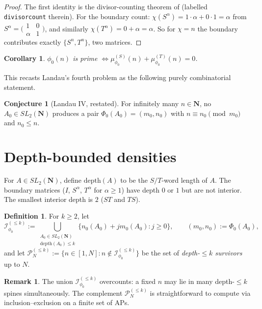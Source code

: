 \documentclass[11pt]{article}
\newtheorem{corollary}[theorem]{Corollary}
\theoremstyle{definition}
\newtheorem{definition}[theorem]{Definition}
\newtheorem{remark}[theorem]{Remark}
\newtheorem{conjecture}[theorem]{Conjecture}
\newcommand{\N}{\mathbf{N}}
\newcommand{\SLN}{SL_2(\N)}
\newcommand{\Phzero}{\Phi_0}
\newcommand{\Iset}{\mathcal{I}_{\phi_0}}
\newcommand{\depth}{\mathrm{depth}}
\begin{document}
\begin{proof}
The first identity is the divisor-counting theorem of \cite{shakov} (labelled \texttt{divisorcount} therein). For the boundary count: $\chi(S^\alpha) = 1 \cdot \alpha + 0 \cdot 1 = \alpha$ from $S^\alpha = \bigl(\begin{smallmatrix}1 & 0 \\ \alpha & 1\end{smallmatrix}\bigr)$, and similarly $\chi(T^\alpha) = 0 + \alpha = \alpha$. So for $\chi = n$ the boundary contributes exactly $\{S^n, T^n\}$, two matrices.
\end{proof}

\begin{corollary}\label{cor:mult-prime}
$\phi_0(n)$ is prime $\iff \mu^{(S)}_{\phi_0}(n) + \mu^{(T)}_{\phi_0}(n) = 0$. \end{corollary}

This recasts Landau's fourth problem as the following purely combinatorial statement.

\begin{conjecture}[Landau IV, restated]\label{conj:landau-mult}
For infinitely many $n \in \N$, no $A_0 \in \SLN$ produces a pair $\Phzero(A_0) = (m_0, n_0)$ with $n \equiv n_0 \pmod{m_0}$ and $n_0 \le n$.
\end{conjecture}

\section{Depth-bounded densities}\label{sec:depth}

For $A \in \SLN$, define $\depth(A)$ to be the $S/T$-word length of $A$. The boundary matrices ($I$, $S^\alpha$, $T^\alpha$ for $\alpha \ge 1$) have depth $0$ or $1$ but are not interior. The smallest interior depth is $2$ ($ST$ and $TS$).

\begin{definition}\label{def:depth-spines}
For $k \ge 2$, let
\[
\Iset^{(\le k)} := \bigcup_{\substack{A_0 \in \SLN \\ \depth(A_0) \le k}} \{n_0(A_0) + j m_0(A_0) : j \ge 0\}, \qquad (m_0, n_0) := \Phzero(A_0),
\]
and let $\mathcal{P}^{(\le k)}_N := \{n \in [1,N] : n \notin \Iset^{(\le k)}\}$ be the set of \emph{depth-$\le k$ survivors} up to $N$.
\end{definition}

\begin{remark}\label{rem:overcount}
The union $\Iset^{(\le k)}$ overcounts: a fixed $n$ may lie in many depth-$\le k$ spines simultaneously. The complement $\mathcal{P}^{(\le k)}_N$ is straightforward to compute via inclusion--exclusion on a finite set of APs.
\end{remark}
\end{document}
